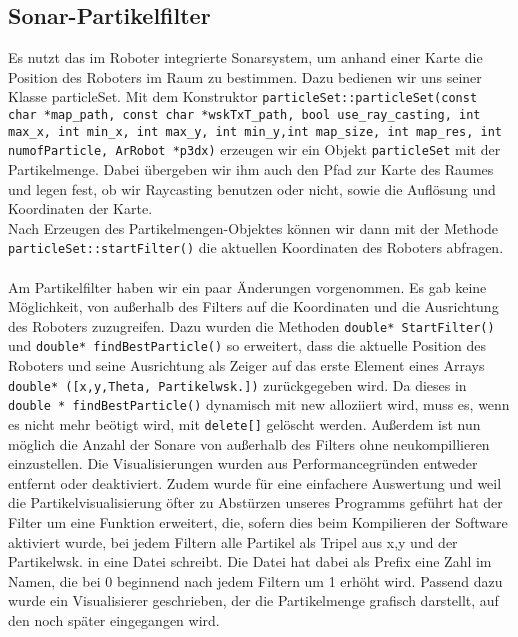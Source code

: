 \subsection{Sonar-Partikelfilter}
\label{sec:sonarparticlefilter}
Es nutzt das im Roboter integrierte
Sonarsystem, um anhand einer Karte die Position des Roboters im Raum
zu bestimmen. Dazu bedienen wir uns seiner Klasse particleSet. 
Mit dem Konstruktor \lstinline|particleSet::particleSet(const char *map_path, const char *wskTxT_path, bool use_ray_casting, int max_x, int min_x, int max_y, int min_y,int map_size, int map_res, int numofParticle, ArRobot *p3dx)| erzeugen wir ein Objekt
\lstinline|particleSet| mit der Partikelmenge. Dabei übergeben wir ihm auch den Pfad zur
Karte des Raumes und legen fest, ob wir Raycasting benutzen oder
nicht, sowie die Auflösung und Koordinaten der Karte.  \\
Nach Erzeugen des Partikelmengen-Objektes können wir dann mit der
Methode \lstinline|particleSet::startFilter()| die aktuellen
Koordinaten des Roboters abfragen. \\\\
Am Partikelfilter haben wir ein paar Änderungen vorgenommen. Es gab keine
Möglichkeit, von außerhalb des Filters auf die Koordinaten und die
Ausrichtung des Roboters zuzugreifen. Dazu wurden die Methoden
\lstinline|double* StartFilter()|
und \lstinline|double* findBestParticle()| so erweitert, dass die aktuelle Position des Roboters
und seine Ausrichtung als Zeiger auf das erste Element eines Arrays
\lstinline|double* ([x,y,Theta, Partikelwsk.])| zurückgegeben wird. Da dieses in
\lstinline|double * findBestParticle()| dynamisch mit new alloziiert wird, muss es, wenn es nicht
mehr beötigt wird, mit \lstinline|delete[]| gelöscht werden. Außerdem ist nun möglich
die Anzahl der Sonare von außerhalb des Filters ohne neukompillieren
einzustellen. Die Visualisierungen wurden aus Performancegründen entweder
entfernt oder deaktiviert. Zudem wurde für eine einfachere Auswertung und
weil die Partikelvisualisierung öfter zu Abstürzen unseres Programms
geführt hat der Filter um eine Funktion erweitert, die, sofern dies
beim Kompilieren der Software aktiviert wurde,  bei jedem Filtern alle Partikel als
Tripel aus x,y und der Partikelwsk. in eine Datei schreibt. Die Datei hat
dabei als Prefix eine Zahl im Namen, die bei 0 beginnend nach jedem Filtern
 um 1 erhöht wird. Passend dazu wurde ein Visualisierer geschrieben, der
die Partikelmenge grafisch darstellt, auf den noch später eingegangen
wird.

